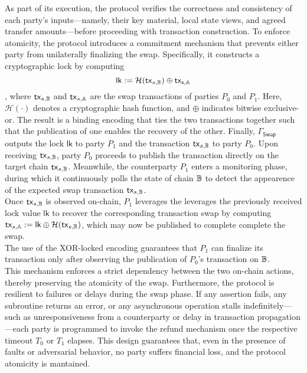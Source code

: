 As part of its execution, the protocol verifies the correctness and consistency of each party’s inputs—namely, their key material, local state views, and agreed transfer amounts—before proceeding with transaction construction.
To enforce atomicity, the protocol introduces a commitment mechanism that prevents either party from unilaterally finalizing the swap. Specifically, it constructs a cryptographic lock by computing \[\mathsf{lk} := \mathcal{H}(\mathsf{tx}_{s, \mathbb{B}}) \oplus  \mathsf{tx}_{\mathsf{s}, \mathbb{A}}\], where  $\mathsf{tx}_{s,\mathbb{B}}$ and $\mathsf{tx}_{s,\mathbb{A}}$ are the swap transactions of parties $P_0$ and $P_1$. Here, $\mathcal{H}(\cdot)$ denotes a cryptographic hash function, and $\oplus$ indicates bitwise exclusive-or. The result is a binding encoding that ties the two transactions together such that the publication of one enables the recovery of the other. Finally,  $\Gamma_{\mathsf{Swap}}$ outputs the lock $\mathsf{lk}$ to party $P_1$ and the transaction $\mathsf{tx}_{s,\mathbb{B}}$ to party $P_0$.
Upon receiving $\mathsf{tx}_{s,\mathbb{B}}$, party $P_0$ proceeds to publish the transaction directly on the target chain $\mathsf{tx}_{s,\mathbb{B}}$. Meanwhile, the counterparty $P_1$ enters a monitoring phase, during which it continuously polls the state of chain $\mathbb{B}$ to detect the appearence of the expected swap transaction $\mathsf{tx}_{s,\mathbb{B}}$. \\
Once $\mathsf{tx}_{s,\mathbb{B}}$ is observed on-chain, $P_1$ leverages the leverages the previously received lock value $\mathsf{lk}$ to recover the corresponding transaction swap by computing $\mathsf{tx}_{s, \mathbb{A}} := \mathsf{lk} \oplus \mathcal{H}(\mathsf{tx}_{s,\mathbb{B}})$, which may now be published to complete complete the swap. \\
The use of the XOR-locked encoding guarantees that $P_1$ can finalize its transaction only after observing the publication of $P_0$'s transaction on $\mathbb{B}$. \\
This mechanism enforces a strict dependency between the two on-chain actions, thereby preserving the atomicity of the swap.
Furthermore, the protocol is resilient to failures or delays during the swap phase. If any assertion fails, any subroutine returns an error, or any asynchronous operation stalls indefinitely—such as unresponsiveness from a counterparty or delay in transaction propagation—each party is programmed to invoke the refund mechanism once the respective timeout $T_0$ or $T_1$ elapses. This design guarantees that, even in the presence of faults or adversarial behavior, no party suffers financial loss, and the protocol atomicity is mantained.

